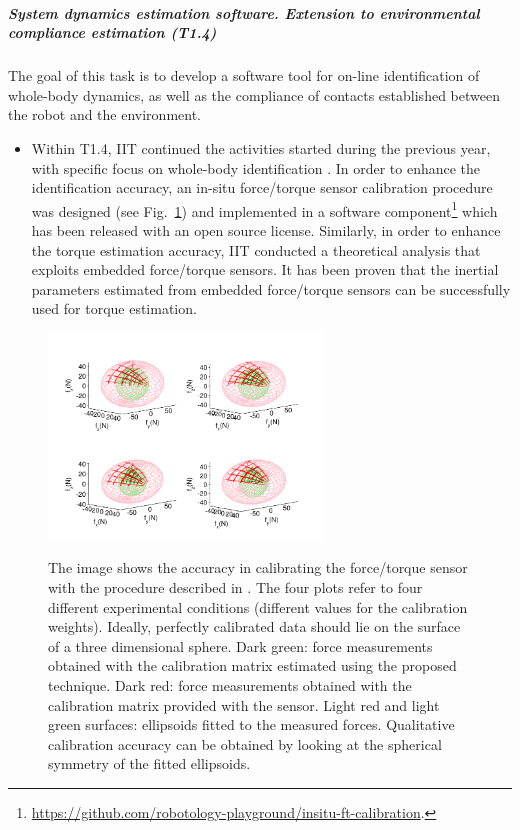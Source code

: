 
\subparagraph{System dynamics estimation software. Extension to
environmental compliance estimation (T1.4)}

The goal of this task is to develop a software tool for on-line identification of whole-body dynamics, as well as the compliance of contacts established between the robot and the environment. 

\begin{itemize}
\item Within T1.4, IIT continued the activities started during the previous year, with specific focus on whole-body identification \cite{Traversaro2013, Traversaro2014}. In order to enhance the identification accuracy, an in-situ force/torque sensor calibration procedure was designed \cite{Traversaro2015b} (see Fig.~\ref{fig:validation}) and implemented in a software component\footnote{\url{https://github.com/robotology-playground/insitu-ft-calibration}.} which has been released with an open source license. Similarly, in order to enhance the torque estimation accuracy, IIT conducted a theoretical analysis that exploits embedded force/torque sensors. It has been proven \cite{Traversaro2015} that the inertial parameters estimated from embedded force/torque sensors can be successfully used for torque estimation.
\end{itemize}


\begin{figure}[h]
\vspace{0.5em}
\centering
{\includegraphics[width=0.65\textwidth]{images/leg_validation.pdf}}
\caption{The image shows the accuracy in calibrating the force/torque sensor with the procedure described in \cite{Traversaro2015b}. The four plots refer to four different experimental conditions (different values for the calibration weights). Ideally, perfectly calibrated data should lie on the surface of a three dimensional sphere. Dark green: force measurements obtained with the calibration matrix estimated using the proposed technique. Dark red: force measurements obtained with the calibration matrix provided with the sensor. Light red and light green surfaces: ellipsoids fitted to the measured forces. Qualitative calibration accuracy can be obtained by looking at the spherical symmetry of the fitted ellipsoids.}
\label{fig:validation}
\end{figure}